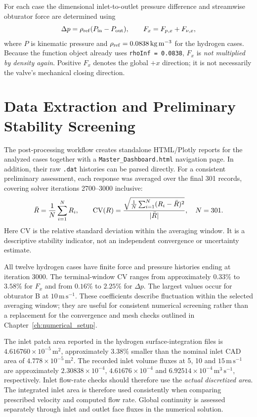 For each case the dimensional inlet-to-outlet pressure difference and streamwise obturator force are determined using
\begin{equation}
\Delta p=\rho_{\rm ref}(P_{\rm in}-P_{\rm out}),\qquad
F_x=F_{p,x}+F_{\nu,x},
\label{eq:processed_responses}
\end{equation}
where $P$ is kinematic pressure and $\rho_{\rm ref}=0.0838\,\mathrm{kg\,m^{-3}}$ for the hydrogen cases. Because the function object already uses \texttt{rhoInf = 0.0838}, $F_x$ is \emph{not multiplied by density again}. Positive $F_x$ denotes the global $+x$ direction; it is not necessarily the valve's mechanical closing direction.

\section{Data Extraction and Preliminary Stability Screening}
\label{sec:plotly_dashboard}

The post-processing workflow creates standalone HTML/Plotly reports for the analyzed cases together with a \texttt{Master\_Dashboard.html} navigation page. In addition, their raw \texttt{.dat} histories can be parsed directly. For a consistent preliminary assessment, each response was averaged over the final 301 records, covering solver iterations 2700--3000 inclusive:
\begin{equation}
\bar R=\frac{1}{N}\sum_{i=1}^N R_i,\qquad
{\rm CV}(R)=\frac{\sqrt{\frac{1}{N}\sum_{i=1}^N(R_i-\bar R)^2}}{|\bar R|},\quad N=301.
\label{eq:terminal_average}
\end{equation}
Here CV is the relative standard deviation within the averaging window. It is a descriptive stability indicator, not an independent convergence or uncertainty estimate.

All twelve hydrogen cases have finite force and pressure histories ending at iteration 3000. The terminal-window CV ranges from approximately $0.33\%$ to $3.58\%$ for $F_x$ and from $0.16\%$ to $2.25\%$ for $\Delta p$. The largest values occur for obturator B at $10\,\mathrm{m\,s^{-1}}$. These coefficients describe fluctuation within the selected averaging window; they are useful for consistent numerical screening rather than a replacement for the convergence and mesh checks outlined in Chapter~\ref{ch:numerical_setup}.

The inlet patch area reported in the hydrogen surface-integration files is $4.616760\times10^{-5}\,\mathrm{m^2}$, approximately $3.38\%$ smaller than the nominal inlet CAD area of $4.778\times10^{-5}\,\mathrm{m^2}$. The recorded inlet volume fluxes at 5, 10 and $15\,\mathrm{m\,s^{-1}}$ are approximately $2.30838\times10^{-4}$, $4.61676\times10^{-4}$ and $6.92514\times10^{-4}\,\mathrm{m^3\,s^{-1}}$, respectively. Inlet flow-rate checks should therefore use the \emph{actual discretized area}. The integrated inlet area is therefore used consistently when comparing prescribed velocity and computed flow rate. Global continuity is assessed separately through inlet and outlet face fluxes in the numerical solution.

